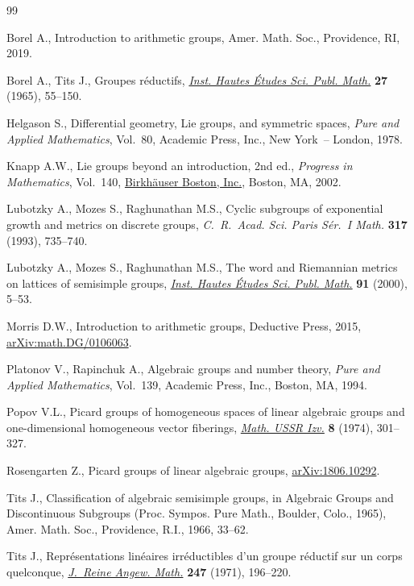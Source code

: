 \documentclass[pdftex]{sigma}
\numberwithin{equation}{section}
\theoremstyle{definition}
\begin{document}
\begin{thebibliography}{99}
\footnotesize\itemsep=0pt

Borel A., Introduction to arithmetic groups, Amer. Math. Soc., Providence, RI,
 2019.

Borel A., Tits J., Groupes r\'eductifs, \href{https://doi.org/10.1007/BF02684375}{\textit{Inst. Hautes \'Etudes Sci. Publ. Math.}} \textbf{27} (1965), 55--150.

Helgason S., Differential geometry, {L}ie groups, and symmetric spaces,
 \textit{Pure and Applied Mathematics}, Vol.~80, Academic Press, Inc., New
 York~-- London, 1978.

Knapp A.W., Lie groups beyond an introduction, 2nd ed., \textit{Progress in
 Mathematics}, Vol.~140, \href{https://doi.org/10.1007/978-1-4757-2453-0}{Birkh\"{a}user Boston, Inc.}, Boston, MA, 2002.

Lubotzky A., Mozes S., Raghunathan M.S., Cyclic subgroups of exponential growth
 and metrics on discrete groups, \textit{C.~R.~Acad. Sci. Paris S\'er.~I
 Math.} \textbf{317} (1993), 735--740.

Lubotzky A., Mozes S., Raghunathan M.S., The word and {R}iemannian metrics on
 lattices of semisimple groups, \href{https://doi.org/10.1007/BF02698740}{\textit{Inst. Hautes \'Etudes Sci. Publ. Math.}} \textbf{91} (2000), 5--53.

Morris D.W., Introduction to arithmetic groups, Deductive Press, 2015,
 \href{https://arxiv.org/abs/math.DG/0106063}{arXiv:math.DG/0106063}.

Platonov V., Rapinchuk A., Algebraic groups and number theory, \textit{Pure and
 Applied Mathematics}, Vol.~139, Academic Press, Inc., Boston, MA, 1994.

Popov V.L., Picard groups of homogeneous spaces of linear algebraic groups and
 one-dimensional homogeneous vector fiberings, \href{https://doi.org/10.1070/IM1974v008n02ABEH002107}{\textit{Math. USSR Izv.}}
 \textbf{8} (1974), 301--327.

Rosengarten Z., Picard groups of linear algebraic groups, \href{https://arxiv.org/abs/1806.10292}{arXiv:1806.10292}.

Tits J., Classification of algebraic semisimple groups, in Algebraic {G}roups
 and {D}iscontinuous {S}ubgroups ({P}roc. {S}ympos. {P}ure {M}ath., {B}oulder,
 {C}olo., 1965), Amer. Math. Soc., Providence, R.I., 1966, 33--62.

Tits J., Repr\'esentations lin\'eaires irr\'eductibles d'un groupe r\'eductif
 sur un corps quelconque, \href{https://doi.org/10.1515/crll.1971.247.196}{\textit{J.~Reine Angew. Math.}} \textbf{247} (1971), 196--220.

\end{thebibliography}\LastPageEnding
\end{document}
